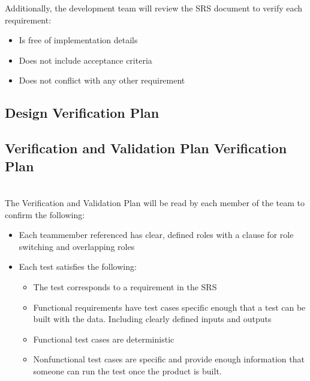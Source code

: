 \documentclass[12pt, titlepage]{article}
\begin{document}
Additionally, the development team will review the SRS document to verify each requirement:
\begin{itemize}
\item Is free of implementation details
\item Does not include acceptance criteria
\item Does not conflict with any other requirement
\end{itemize}


\subsection{Design Verification Plan}




\subsection{Verification and Validation Plan Verification Plan}



\\
The Verification and Validation Plan will be read by each member of the team to confirm the following:
\begin{itemize}
\item Each teammember referenced has clear, defined roles with a clause for role switching and overlapping roles
\item Each test satisfies the following:
\begin{itemize}
\item The test corresponds to a requirement in the SRS
\item Functional requirements have test cases specific enough that a test can be built with the data. Including clearly defined inputs and outputs
\item Functional test cases are deterministic
\item Nonfunctional test cases are specific and provide enough information that someone can run the test once the product is built. 
\end{itemize}

\end{itemize}
\end{document}
